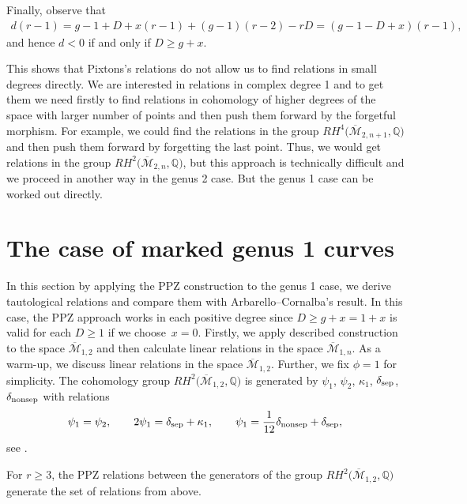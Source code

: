\documentclass[10pt,a4paper]{amsart}
\def\oM{\overline{\mathcal{M}}}
\numberwithin{equation}{section}
\begin{document}
 Finally, observe that
\begin{align*}
d(r-1) = g-1+D+x(r-1) + (g-1)(r-2) - r D = (g - 1- D + x)(r - 1),
\end{align*}
and hence
$ d<0$ if and only if $D\geq g+x$.

This shows that Pixtons's relations do not allow us to find relations in small degrees directly. We are interested in relations in complex degree 1 and to get them we need firstly to find relations in cohomology of higher degrees of the space with larger number of points and then push them forward by the forgetful morphism. For example, we could find the relations in the group $RH^4\big(\oM_{2,n+1},\mathbb{Q}\big)$ and then push them forward by forgetting the last point. Thus, we would get relations in the group $RH^2\big(\oM_{2,n},\mathbb{Q}\big)$, but this approach is technically difficult and we proceed in another way in the genus 2 case. But the genus 1 case can be worked out directly.

\section{The case of marked genus 1 curves}
In this section by applying the PPZ construction to the genus 1 case, we derive tautological relations and compare them with Arbarello--Cornalba's result. In this case, the PPZ approach works in each positive degree since $D\geq g+x =1+x$ is valid for each $D\geq1$ if we choose~${x=0}$.
Firstly, we apply described construction to the space $\oM_{1,2}$ and then calculate linear relations in the space $\oM_{1,n}$.
As a warm-up, we discuss linear relations in the space $\oM_{1,2}$. Further, we fix ${\phi=1}$ for simplicity.
The cohomology group $RH^2\big(\oM_{1,2},\mathbb{Q}\big)$ is generated by $\psi_1$, $\psi_2$, $\kappa_1$, $\delta_{\rm sep}$, $\delta_{\rm nonsep}$ with relations
\begin{align*}
\psi_1 = \psi_2,\qquad
2\psi_1 =\delta_{\rm sep}+\kappa_1,\qquad
 \psi_1 =\dfrac{1}{12}\delta_{\rm nonsep}+\delta_{\rm sep},
\end{align*}
see \cite[Theorem 2.2]{Cor}.

\begin{Example}
For $r\geq3$, the PPZ relations between the generators of the group $RH^2\big(\oM_{1,2},\mathbb{Q}\big)$ generate the set of relations from above.
\end{Example}
\end{document}
